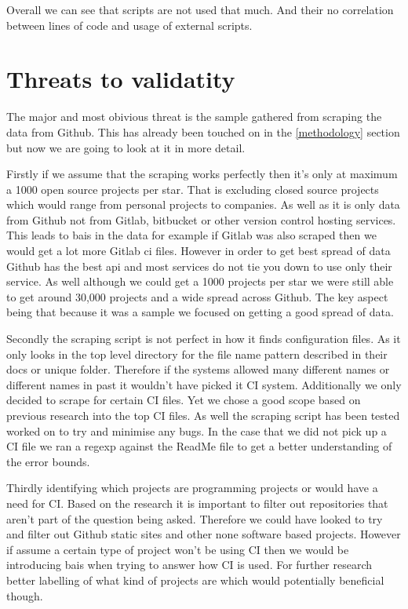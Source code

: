 \documentclass[twoside,12pt,titlepage,a4paper]{article}
\begin{document}
Overall we can see that scripts are not used that much. And their no correlation between lines of code and usage of external scripts.


\pagebreak

\section{Threats to validatity}

The major and most obivious threat is the sample gathered from scraping the data from Github. This has already been touched on in the \ref{methodology} section but now we are going to look at it in more detail.

Firstly if we assume that the scraping works perfectly then it's only at maximum a 1000 open source projects per star. That is excluding closed source projects which would range from personal projects to companies. As well as it is only data from Github not from Gitlab, bitbucket or other version control hosting services. This leads to bais in the data for example if Gitlab was also scraped then we would get a lot more Gitlab ci files. However in order to get best spread of data Github has the best api and most services do not tie you down to use only their service. As well although we could get a 1000 projects per star we were still able to get around 30,000 projects and a wide spread across Github. The key aspect being that because it was a sample we focused on getting a good spread of data.

Secondly the scraping script is not perfect in how it finds configuration files. As it only looks in the top level directory for the file name pattern described in their docs or unique folder. Therefore if the systems allowed many different names or different names in past it wouldn't have picked it CI system. Additionally we only decided to scrape for certain CI files. Yet we chose a good scope based on previous research into the top CI files. As well the scraping script has been tested worked on to try and minimise any bugs. In the case that we did not pick up a CI file we ran a regexp against the ReadMe file to get a better understanding of the error bounds.

Thirdly identifying which projects are programming projects or would have a need for CI. Based on the research \cite{Kalliamvakou2014} it is important to filter out repositories that aren't part of the question being asked. Therefore we could have looked to try and filter out Github static sites and other none software based projects. However if assume a certain type of project won't be using CI then we would be introducing bais when trying to answer how CI is used. For further research better labelling of what kind of projects are which would potentially beneficial though.
\end{document}
